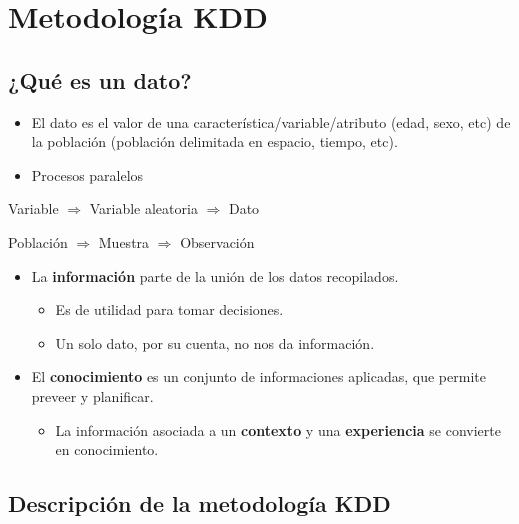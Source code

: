 \documentclass[
]{book}
\providecommand{\tightlist}{%
  \setlength{\itemsep}{0pt}\setlength{\parskip}{0pt}}
\begin{document}
\hypertarget{metodologuxeda-kdd}{%
\section{Metodología KDD}\label{metodologuxeda-kdd}}

\hypertarget{quuxe9-es-un-dato}{%
\subsection{¿Qué es un dato?}\label{quuxe9-es-un-dato}}

\begin{itemize}
\item
  El dato es el valor de una
  característica/variable/atributo
  (edad, sexo, etc) de la población
  (población delimitada en espacio, tiempo, etc).
\item
  Procesos paralelos
\end{itemize}

Variable
\(\Rightarrow\)
Variable aleatoria
\(\Rightarrow\)
Dato

Población
\(\Rightarrow\)
Muestra
\(\Rightarrow\)
Observación

\begin{itemize}
\tightlist
\item
  La \textbf{información} parte de la unión
  de los datos recopilados.

  \begin{itemize}
  \tightlist
  \item
    Es de utilidad para tomar decisiones.
  \item
    Un solo dato, por su cuenta,
    no nos da información.
  \end{itemize}
\item
  El \textbf{conocimiento} es un conjunto de informaciones
  aplicadas, que permite preveer y planificar.

  \begin{itemize}
  \tightlist
  \item
    La información asociada a un \textbf{contexto} y una
    \textbf{experiencia} se convierte en conocimiento.
  \end{itemize}
\end{itemize}

\hypertarget{descripciuxf3n-de-la-metodologuxeda-kdd}{%
\subsection{Descripción de la metodología KDD}\label{descripciuxf3n-de-la-metodologuxeda-kdd}}
\end{document}
